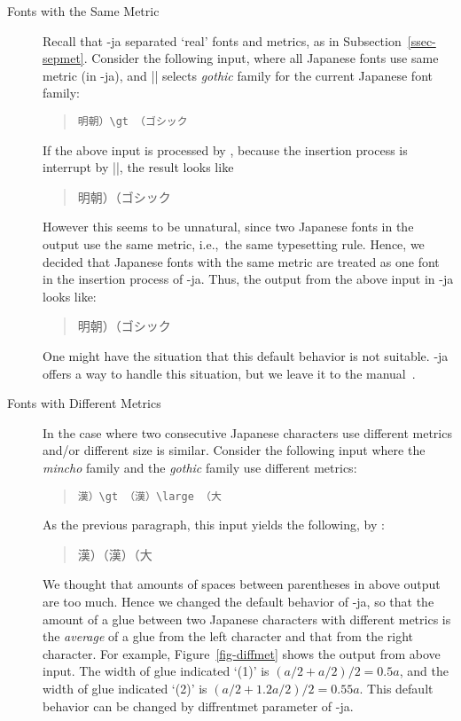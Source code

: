 \documentclass{ajt}
\begin{document}
\begin{description}
\item[Fonts with the Same Metric]
Recall that \LuaTeX-ja separated `real' fonts and metrics, as in Subsection~\ref{ssec-sepmet}. 
Consider the following input, where all Japanese fonts use same metric
	   (in \LuaTeX-ja), and |\gt| selects \emph{gothic} family for
	   the current Japanese font family:
\begin{quote}
\begin{verbatim}
明朝）\gt （ゴシック
\end{verbatim}
\end{quote}
If the above input is processed by \pTeX, because the insertion process is
	   interrupt by |\gt|, the result looks like
\begin{quote}
\mc 明朝）\hbox{}\gt （ゴシック
\end{quote}
However this seems to be unnatural, since two Japanese fonts in the
	   output use the same metric, i.e.,~the same
	   typesetting rule.  Hence, we decided that Japanese fonts with
	   the same metric are treated as one font in the insertion
	   process of \LuaTeX-ja. Thus, the output from the above input
	   in \LuaTeX-ja looks like:
\begin{quote}
\mc 明朝）\gt （ゴシック
\end{quote}
One might have the situation that this default behavior is not
	   suitable. \LuaTeX-ja offers a way to handle this situation, but
	   we leave it to the manual~\cite{man}.

\item[Fonts with Different Metrics] 
In the case where two consecutive Japanese characters use different metrics and/or
	   different size is similar. Consider the following input where
	   the \emph{mincho} family and the \emph{gothic} family use
	   different metrics:
\begin{quote}
\begin{verbatim}
漢）\gt （漢）\large （大
\end{verbatim}
\end{quote}
As the previous paragraph, this input yields the following, by \pTeX:
\begin{quote}
\mc 漢）\hbox{}\gt （漢）\hbox{}\large （大
\end{quote}
We thought that amounts of spaces between parentheses in above output
	   are too much. Hence we changed the default behavior of
	   \LuaTeX-ja, so that the amount of a glue between two Japanese
	   characters with different metrics is the \emph{average} of a glue
	   from the left character and that from the right
	   character. For example, Figure~\ref{fig-diffmet} shows the
	   output from above input. The width of glue indicated `(1)' is
	   $(a/2 + a/2)/2 = 0.5a$, and the width of glue indicated `(2)'
	   is $(a/2 + 1.2a/2)/2 = 0.55a$. This default behavior can be
	   changed by \textsf{diffrentmet} parameter of \LuaTeX-ja.


\end{description}
\end{document}
